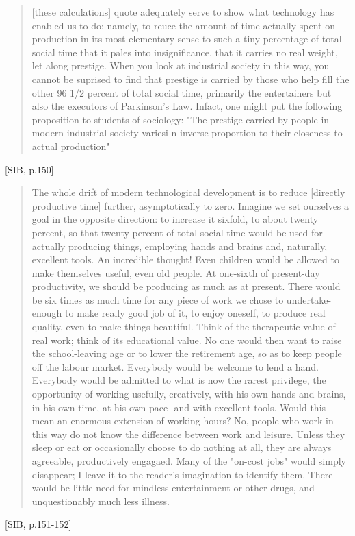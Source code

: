 \documentclass[letterpaper]{article}
\begin{document}
\begin{quote}
  [these calculations] quote adequately serve to show what technology has enabled us to do: namely, to reuce the amount of time actually spent on production in its most elementary sense to such a tiny percentage of total social time that it pales into insignificance, that it carries no real weight, let along prestige. When you look at industrial society in this way, you cannot be suprised to find that prestige is carried by those who help fill the other 96 1/2 percent of total social time, primarily the entertainers but also the executors of Parkinson's Law. Infact, one might put the following proposition to students of sociology: "The prestige carried by people in modern industrial society variesi n inverse proportion to their closeness to actual production"
\end{quote} [SIB, p.150]

\begin{quote}
  The whole drift of modern technological development is to reduce [directly productive time] further, asymptotically to zero. Imagine we set ourselves a goal in the opposite direction: to increase it sixfold, to about twenty percent, so that twenty percent of total social time would be used for actually producing things, employing hands and brains and, naturally, excellent tools. An incredible thought! Even children would be allowed to make themselves useful, even old people. At one-sixth of present-day productivity, we should be producing as much as at present. There would be six times as much time for any piece of work we chose to undertake- enough to make really good job of it, to enjoy oneself, to produce real quality, even to make things beautiful. Think of the therapeutic value of real work; think of its educational value. No one would then want to raise the school-leaving age or to lower the retirement age, so as to keep people off the labour market. Everybody would be welcome to lend a hand. Everybody would be admitted to what is now the rarest privilege, the opportunity of working usefully, creatively, with his own hands and brains, in his own time, at his own pace- and with excellent tools. Would this mean an enormous extension of working hours? No, people who work in this way do not know the difference between work and leisure. Unless they sleep or eat or occasionally choose to do nothing at all, they are always agreeable, productively engagaed. Many of the "on-cost jobs" would simply disappear; I leave it to the reader's imagination to identify them. There would be little need for mindless entertainment or other drugs, and unquestionably much less illness.
\end{quote}[SIB, p.151-152]
\end{document}
